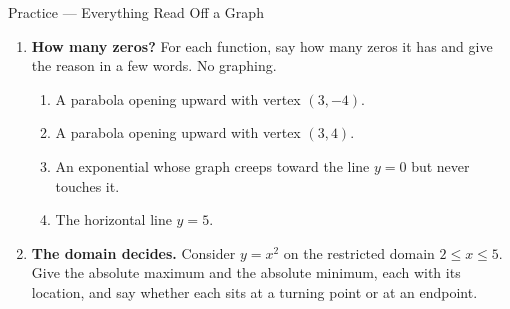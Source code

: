 \documentclass[10pt]{article}
\begin{document}
\begin{notesbox}{Practice --- Everything Read Off a Graph}
\begin{enumerate}[leftmargin=1.6em, itemsep=6pt, topsep=4pt]
\tcbbreak
\item \textbf{How many zeros?} For each function, say how many zeros it has and give the reason in a
few words. No graphing.
\begin{enumerate}[label=(\alph*), leftmargin=1.6em, itemsep=3pt, topsep=3pt]
  \item A parabola opening upward with vertex $(3,-4)$.
  \item A parabola opening upward with vertex $(3,4)$.
  \item An exponential whose graph creeps toward the line $y=0$ but never touches it.
  \item The horizontal line $y=5$.
\end{enumerate}


\item \textbf{The domain decides.} Consider $y=x^2$ on the restricted domain $2 \le x \le 5$. Give
the absolute maximum and the absolute minimum, each with its location, and say whether each sits at
a turning point or at an endpoint.


\end{enumerate}
\end{notesbox}

\vspace{0.10in}
\end{document}
